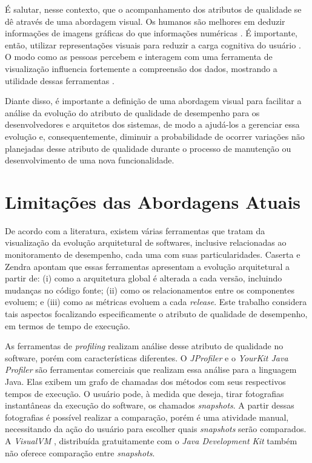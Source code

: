 É salutar, nesse contexto, que o acompanhamento dos atributos de qualidade se dê através de uma abordagem visual. Os humanos são melhores em deduzir informações de imagens gráficas do que informações numéricas \cite{Marr1982a}. É importante, então, utilizar representações visuais para reduzir a carga cognitiva do usuário \cite{Tudoreanu2003}. O modo como as pessoas percebem e interagem com uma ferramenta de visualização influencia fortemente a compreensão dos dados, mostrando a utilidade dessas ferramentas \cite{ToryMelanieandMoller2004}.

Diante disso, é importante a definição de uma abordagem visual para facilitar a análise da evolução do atributo de qualidade de desempenho para os desenvolvedores e arquitetos dos sistemas, de modo a ajudá-los a gerenciar essa evolução e, consequentemente, diminuir a probabilidade de ocorrer variações não planejadas desse atributo de qualidade durante o processo de manutenção ou desenvolvimento de uma nova funcionalidade.

\section{Limitações das Abordagens Atuais} \label{sec:limitacao-abordagens-atuais}

De acordo com a literatura, existem várias ferramentas que tratam da visualização da evolução arquitetural de softwares, inclusive relacionadas ao monitoramento de desempenho, cada uma com suas particularidades. Caserta e Zendra \cite{Caserta2011} apontam que essas ferramentas apresentam a evolução arquitetural a partir de: (i) como a arquitetura global é alterada a cada versão, incluindo mudanças no código fonte; (ii) como os relacionamentos entre os componentes evoluem; e (iii) como as métricas evoluem a cada \textit{release}. Este trabalho considera tais aspectos focalizando especificamente o atributo de qualidade de desempenho, em termos de tempo de execução.

As ferramentas de \textit{profiling} realizam análise desse atributo de qualidade no software, porém com características diferentes. O \textit{JProfiler} \cite{JProfiler} e o \textit{YourKit Java Profiler} \cite{Profiler2016} são ferramentas comerciais que realizam essa análise para a linguagem Java. Elas exibem um grafo de chamadas dos métodos com seus respectivos tempos de execução. O usuário pode, à medida que deseja, tirar fotografias instantâneas da execução do software, os chamados \textit{snapshots}. A partir dessas fotografias é possível realizar a comparação, porém é uma atividade manual, necessitando da ação do usuário para escolher quais \textit{snapshots} serão comparados. A \textit{VisualVM} \cite{Vis}, distribuída gratuitamente com o \textit{Java Development Kit}  também não oferece comparação entre \textit{snapshots}.


